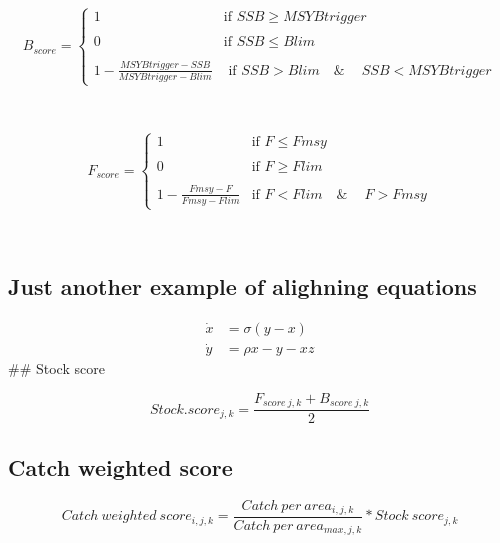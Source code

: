 \documentclass[
]{article}
\begin{document}
\[
\begin{equation}
  B_{score} =
    \begin{cases}
      1 & \text{if $SSB \ge MSYBtrigger$}\\
    \\
      0 & \text{if $SSB \le Blim$}\\
    \\
      1 - \frac{MSYBtrigger - SSB}{MSYBtrigger - Blim} & \text{ if $SSB > Blim  \quad  \&\ \quad SSB < MSYBtrigger$}
    \end{cases}       
\end{equation}
 \]

\(~\) \(~\) \(~\) \(~\)

\[
\begin{equation}
  F_{score} =
    \begin{cases}
      1 & \text{if $F \le Fmsy$}\\
    \\  
      0 & \text{if $F \ge Flim $}\\
      \\
      1 - \frac{Fmsy - F}{Fmsy - Flim} & \text{if $F < Flim  \quad  \&\ \quad F > Fmsy$}
    \end{cases}       
\end{equation}
 \]

\(~\) \(~\) \(~\)

\hypertarget{just-another-example-of-alighning-equations}{%
\subsection{Just another example of alighning
equations}\label{just-another-example-of-alighning-equations}}

\[
\begin{aligned}
  \dot{x} & = \sigma(y-x) \\
  \dot{y} & = \rho x- y - xz 
\end{aligned}
\] \#\# Stock score

\[Stock.score_{j,k} = \frac{F_{score\ j,k} +B_{score\ j,k}}{2}\]

\hypertarget{catch-weighted-score}{%
\subsection{Catch weighted score}\label{catch-weighted-score}}

\[Catch\ weighted \ score_{i,j, k} = \frac{Catch\ per\ area_{i,j,k}}{Catch\ per\ area_{max,j,k}}*Stock\ score_{j,k}\]
\end{document}
